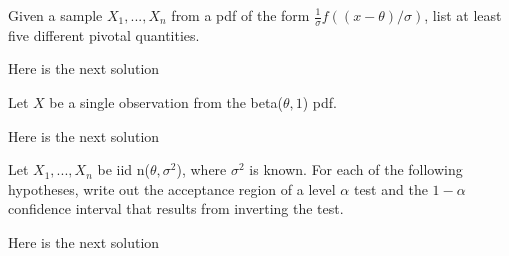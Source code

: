 \documentclass[12pt,letterpaper]{exam}
\begin{document}
\begin{questions}
\renewcommand{\thequestion}{8}
	\question Given a sample $X_1, ..., X_n$ from a pdf of the form $\frac{1}{\sigma}f((x-\theta)/\sigma)$, list at least five different pivotal quantities.
	\begin{solution}
		Here is the next solution
	\end{solution}

\renewcommand{\thequestion}{13}
	\question Let $X$ be a single observation from the beta($\theta, 1$) pdf.
	\begin{solution}
		Here is the next solution
	\end{solution}

\renewcommand{\thequestion}{16}
	\question Let $X_1, ..., X_n$ be iid n($\theta, \sigma^2$), where $\sigma^2$ is known. For each of the following hypotheses, write out the acceptance region of a level $\alpha$ test and the $1-\alpha$ confidence interval that results from inverting the test.
	\begin{solution}
		Here is the next solution
	\end{solution}

\end{questions}
\end{document}
